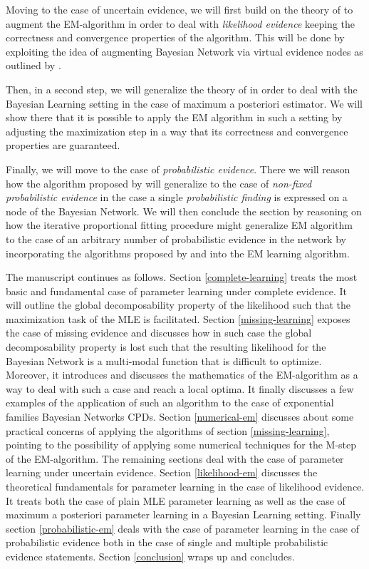 \documentclass[11pt]{article}
\begin{document}
\begin{article}
Moving to the case of uncertain evidence, we will first build on
the theory of \cite{Wasserkrug_all} to augment the EM-algorithm in
order to deal with \emph{likelihood evidence} keeping the correctness
and convergence properties of the algorithm. This will be done by
exploiting the idea of augmenting Bayesian Network via virtual
evidence nodes as outlined by \cite{pearl2014probabilistic}.

Then, in a second step, we will generalize the theory of
\cite{Wasserkrug_all} in order to deal with the Bayesian Learning
setting in the case of maximum a posteriori estimator. We will show
there that it is possible to apply the EM algorithm in such a
setting by adjusting the maximization step in a way that its
correctness and convergence properties are guaranteed.

Finally, we will move to the case of \emph{probabilistic
evidence}. There we will reason how the algorithm proposed by
\cite{Wasserkrug_all} will generalize to the case of \emph{non-fixed
probabilistic evidence} in the case a single \emph{probabilistic
finding} is expressed on a node of the Bayesian Network. We will
then conclude the section by reasoning on how the iterative
proportional fitting procedure might generalize EM algorithm to the
case of an arbitrary number of probabilistic evidence in the
network by incorporating the algorithms proposed by \cite{PENG_2010}
and \cite{meng2016method} into the EM learning algorithm.

The manuscript continues as follows. Section \ref{complete-learning}
treats the most basic and fundamental case of parameter learning
under complete evidence. It will outline the global decomposability
property of the likelihood such that the maximization task of the
MLE is facilitated. Section \ref{missing-learning} exposes the case of missing evidence
and discusses how in such case the global decomposability property
is lost such that the resulting likelihood for the Bayesian Network
is a multi-modal function that is difficult to optimize. Moreover,
it introduces and discusses the mathematics of the EM-algorithm as
a way to deal with such a case and reach a local optima. It finally
discusses a few examples of the application of such an algorithm to
the case of exponential families Bayesian Networks CPDs. Section
\ref{numerical-em} discusses about some practical concerns of applying
the algorithms of section \ref{missing-learning}, pointing to the
possibility of applying some numerical techniques for the M-step of
the EM-algorithm. The remaining sections deal with the case of
parameter learning under uncertain evidence. Section \ref{likelihood-em}
discusses the theoretical fundamentals for parameter learning in
the case of likelihood evidence. It treats both the case of plain
MLE parameter learning as well as the case of maximum a posteriori
parameter learning in a Bayesian Learning setting. Finally section
\ref{probabilistic-em} deals with the case of parameter learning in the
case of probabilistic evidence both in the case of single and
multiple probabilistic evidence statements. Section \ref{conclusion}
wraps up and concludes.


\end{article}
\end{document}
